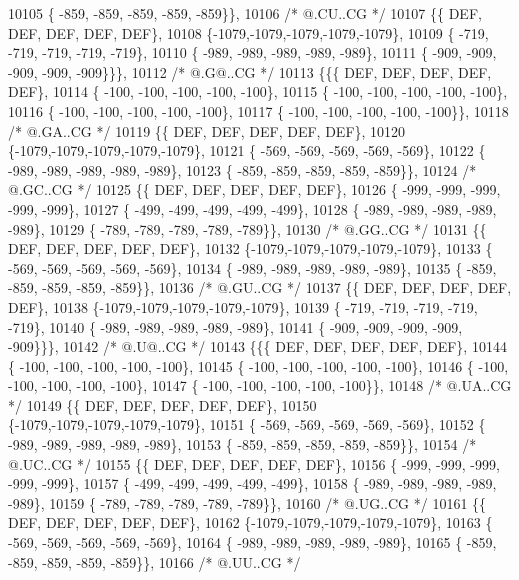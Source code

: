 \begin{DoxyCode}
10105 \{ -859, -859, -859, -859, -859\}\},
10106 \textcolor{comment}{/*  @.CU..CG */}
10107 \{\{  DEF,  DEF,  DEF,  DEF,  DEF\},
10108 \{-1079,-1079,-1079,-1079,-1079\},
10109 \{ -719, -719, -719, -719, -719\},
10110 \{ -989, -989, -989, -989, -989\},
10111 \{ -909, -909, -909, -909, -909\}\}\},
10112 \textcolor{comment}{/*  @.G@..CG */}
10113 \{\{\{  DEF,  DEF,  DEF,  DEF,  DEF\},
10114 \{ -100, -100, -100, -100, -100\},
10115 \{ -100, -100, -100, -100, -100\},
10116 \{ -100, -100, -100, -100, -100\},
10117 \{ -100, -100, -100, -100, -100\}\},
10118 \textcolor{comment}{/*  @.GA..CG */}
10119 \{\{  DEF,  DEF,  DEF,  DEF,  DEF\},
10120 \{-1079,-1079,-1079,-1079,-1079\},
10121 \{ -569, -569, -569, -569, -569\},
10122 \{ -989, -989, -989, -989, -989\},
10123 \{ -859, -859, -859, -859, -859\}\},
10124 \textcolor{comment}{/*  @.GC..CG */}
10125 \{\{  DEF,  DEF,  DEF,  DEF,  DEF\},
10126 \{ -999, -999, -999, -999, -999\},
10127 \{ -499, -499, -499, -499, -499\},
10128 \{ -989, -989, -989, -989, -989\},
10129 \{ -789, -789, -789, -789, -789\}\},
10130 \textcolor{comment}{/*  @.GG..CG */}
10131 \{\{  DEF,  DEF,  DEF,  DEF,  DEF\},
10132 \{-1079,-1079,-1079,-1079,-1079\},
10133 \{ -569, -569, -569, -569, -569\},
10134 \{ -989, -989, -989, -989, -989\},
10135 \{ -859, -859, -859, -859, -859\}\},
10136 \textcolor{comment}{/*  @.GU..CG */}
10137 \{\{  DEF,  DEF,  DEF,  DEF,  DEF\},
10138 \{-1079,-1079,-1079,-1079,-1079\},
10139 \{ -719, -719, -719, -719, -719\},
10140 \{ -989, -989, -989, -989, -989\},
10141 \{ -909, -909, -909, -909, -909\}\}\},
10142 \textcolor{comment}{/*  @.U@..CG */}
10143 \{\{\{  DEF,  DEF,  DEF,  DEF,  DEF\},
10144 \{ -100, -100, -100, -100, -100\},
10145 \{ -100, -100, -100, -100, -100\},
10146 \{ -100, -100, -100, -100, -100\},
10147 \{ -100, -100, -100, -100, -100\}\},
10148 \textcolor{comment}{/*  @.UA..CG */}
10149 \{\{  DEF,  DEF,  DEF,  DEF,  DEF\},
10150 \{-1079,-1079,-1079,-1079,-1079\},
10151 \{ -569, -569, -569, -569, -569\},
10152 \{ -989, -989, -989, -989, -989\},
10153 \{ -859, -859, -859, -859, -859\}\},
10154 \textcolor{comment}{/*  @.UC..CG */}
10155 \{\{  DEF,  DEF,  DEF,  DEF,  DEF\},
10156 \{ -999, -999, -999, -999, -999\},
10157 \{ -499, -499, -499, -499, -499\},
10158 \{ -989, -989, -989, -989, -989\},
10159 \{ -789, -789, -789, -789, -789\}\},
10160 \textcolor{comment}{/*  @.UG..CG */}
10161 \{\{  DEF,  DEF,  DEF,  DEF,  DEF\},
10162 \{-1079,-1079,-1079,-1079,-1079\},
10163 \{ -569, -569, -569, -569, -569\},
10164 \{ -989, -989, -989, -989, -989\},
10165 \{ -859, -859, -859, -859, -859\}\},
10166 \textcolor{comment}{/*  @.UU..CG */}

\end{DoxyCode}
